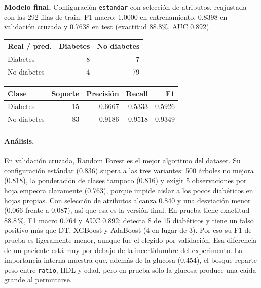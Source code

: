 \documentclass[11pt]{article}
\begin{document}
\textbf{Modelo final.} Configuración \texttt{estandar} con selección de atributos, reajustada con las 292 filas de train. F1 macro: 1.0000 en entrenamiento, 0.8398 en validación cruzada y 0.7638 en test (exactitud 88.8\%, AUC 0.892).

\begin{table}[H]\footnotesize\begin{minipage}[t]{0.44\linewidth}\centering{}\begin{tabular}{lrr}\toprule
Real / pred. & Diabetes & No diabetes \\ \midrule
Diabetes & 8 & 7 \\
No diabetes & 4 & 79 \\
\bottomrule\end{tabular}\end{minipage}\hfill\begin{minipage}[t]{0.52\linewidth}\centering{}\begin{tabular}{lrrrr}\toprule
Clase & Soporte & Precisión & Recall & F1 \\ \midrule
Diabetes & 15 & 0.6667 & 0.5333 & 0.5926 \\
No diabetes & 83 & 0.9186 & 0.9518 & 0.9349 \\
\bottomrule\end{tabular}\end{minipage}\end{table}

\paragraph{Análisis.} En validación cruzada, Random Forest es el mejor algoritmo del dataset. Su
configuración estándar (0.836) supera a las tres variantes: 500 árboles no mejora
(0.818), la ponderación de clases tampoco (0.816) y exigir 5 observaciones por hoja
empeora claramente (0.763), porque impide aislar a los pocos diabéticos en hojas
propias. Con selección de atributos alcanza 0.840 y una desviación menor (0.066 frente
a 0.087), así que esa es la versión final. En prueba tiene exactitud 88.8\,\%, F1
macro 0.764 y AUC 0.892; detecta 8 de 15 diabéticos y tiene un falso positivo más que
DT, XGBoost y AdaBoost (4 en lugar de 3). Por eso su F1 de prueba es ligeramente menor,
aunque fue el elegido por validación. Esa diferencia de un paciente está muy por debajo
de la incertidumbre del experimento. La importancia interna muestra que, además de la
glucosa (0.454), el bosque reparte peso entre \texttt{ratio}, HDL y edad, pero en
prueba sólo la glucosa produce una caída grande al permutarse.
\end{document}
